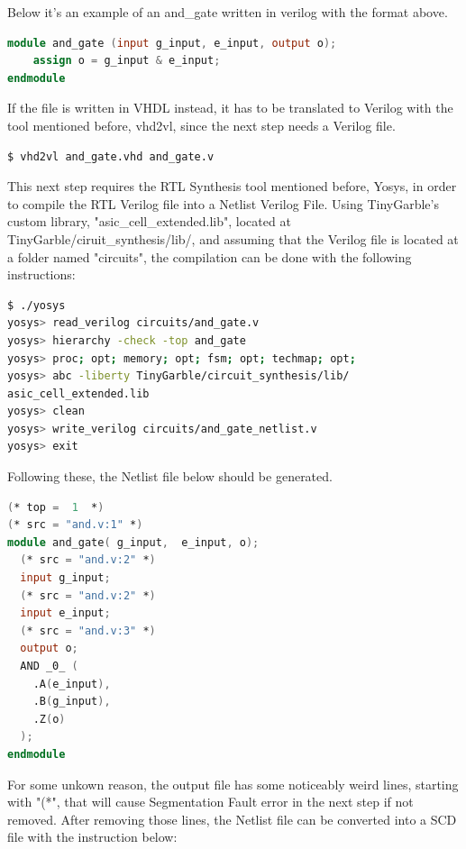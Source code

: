 \begin{refsection}
Below it's an example of an and\_gate written in verilog with the format above.

\begin{lstlisting}[caption={and\_gate.v}, language=Verilog, captionpos=b]
module and_gate (input g_input, e_input, output o);
	assign o = g_input & e_input;
endmodule
\end{lstlisting}

If the file is written in VHDL instead, it has to be translated to Verilog with the tool mentioned before, vhd2vl, since the next step needs a Verilog file.

\begin{lstlisting}[caption={Translation of VHDL file into Verilog}, language=bash, captionpos=b]
$ vhd2vl and_gate.vhd and_gate.v	
\end{lstlisting}

This next step requires the RTL Synthesis tool mentioned before, Yosys, in order to compile the RTL Verilog file into a Netlist Verilog File.
Using TinyGarble's custom library, "asic\_cell\_extended.lib", located at TinyGarble/ciruit\_synthesis/lib/, and assuming that the Verilog file is located at a folder named "circuits", the compilation can be done with the following instructions:

\begin{lstlisting}[caption={Yosys instructions to compile the HDL file to a Netlist file}, language=bash, captionpos=b]
$ ./yosys
yosys> read_verilog circuits/and_gate.v
yosys> hierarchy -check -top and_gate
yosys> proc; opt; memory; opt; fsm; opt; techmap; opt;
yosys> abc -liberty TinyGarble/circuit_synthesis/lib/
asic_cell_extended.lib
yosys> clean
yosys> write_verilog circuits/and_gate_netlist.v
yosys> exit					
\end{lstlisting}

Following these, the Netlist file below should be generated.

\begin{lstlisting}[caption={and\_gate\_netlist.v}, language=Verilog, captionpos=b]
(* top =  1  *)
(* src = "and.v:1" *)
module and_gate( g_input,  e_input, o);
  (* src = "and.v:2" *)
  input g_input;
  (* src = "and.v:2" *)
  input e_input;
  (* src = "and.v:3" *)
  output o;
  AND _0_ (
    .A(e_input),
    .B(g_input),
    .Z(o)
  );
endmodule
\end{lstlisting}

For some unkown reason, the output file has some noticeably weird lines, starting with "(*", that will cause Segmentation Fault error in the next step if not removed.
After removing those lines, the Netlist file can be converted into a SCD file with the instruction below:


\end{refsection}
